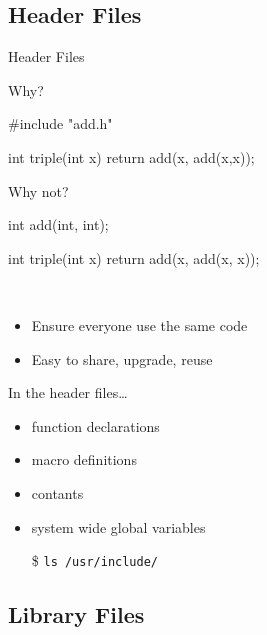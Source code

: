 \subsection{Header Files}
\label{sec:header-files}

\begin{frame}[fragile]{Header Files}
  \begin{minipage}{.45\linewidth}
    \begin{iblock}{Why?}
\begin{ccode}
#include "add.h"

int triple(int x)
{
  return add(x, add(x,x));
}
\end{ccode}
    \end{iblock}
  \end{minipage}\qquad
  \begin{minipage}{.45\linewidth}
    \begin{iblock}{Why not?}
\begin{ccode}
int add(int, int);

int triple(int x)
{
  return add(x, add(x, x));
}
\end{ccode}
    \end{iblock}
  \end{minipage}\\[1ex]
  \begin{itemize}
  \item Ensure everyone use the same code
  \item Easy to share, upgrade, reuse
  \end{itemize}
  \begin{block}{In the header files\ldots}
    \begin{multicols}{2}
      \begin{itemize}
      \item function declarations
      \item macro definitions
      \item contants
      \item system wide global variables
      \end{itemize}
    \end{multicols}
  \end{block}
  \begin{itemize}
  \item[\$] \texttt{ls /usr/include/}
  \end{itemize}
\end{frame}

\subsection{Library Files}
\label{sec:library-files}

